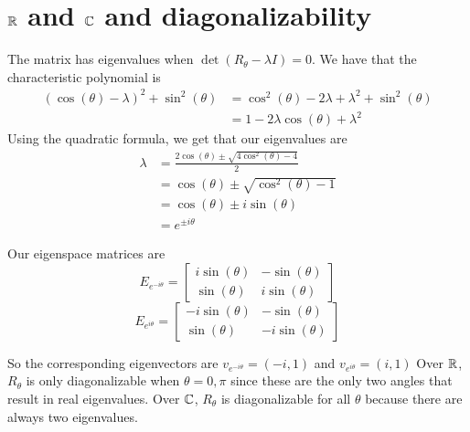 \section{$\mathbb{R}$ and $\mathbb{C}$ and diagonalizability}

The matrix has eigenvalues when
$\det(R_\theta - \lambda I) = 0$.
We have that the characteristic polynomial is
\begin{align}
    (\cos(\theta)-\lambda)^2 + \sin^2(\theta)
    &= \cos^2(\theta) - 2\lambda + \lambda^2 + \sin^2(\theta)\\
    &= 1 - 2\lambda\cos(\theta) + \lambda^2
\end{align}
Using the quadratic formula, we get that our eigenvalues are
\begin{align}
    \lambda
    &= \frac{2\cos(\theta) \pm \sqrt{4\cos^2(\theta) - 4}}{2}\\
    &= \cos(\theta) \pm \sqrt{\cos^2(\theta) - 1}\\
    &= \cos(\theta) \pm i \sin(\theta)\\
    &= e^{\pm i\theta}
\end{align}

Our eigenspace matrices are
\[
E_{e^{-i\theta}} =
\begin{bmatrix}
    i \sin(\theta) & -\sin(\theta)\\
    \sin(\theta) & i \sin(\theta)
\end{bmatrix} 
\]
\[
E_{e^{i\theta}} =
\begin{bmatrix}
    -i \sin(\theta) & -\sin(\theta)\\
    \sin(\theta) & -i \sin(\theta)
\end{bmatrix}
\]

So the corresponding eigenvectors are 
$v_{e^{-i\theta}} = (-i, 1)$ and
$v_{e^{i\theta}} = (i, 1)$
Over $\mathbb{R}$, $R_\theta$ is only diagonalizable when $\theta = 0, \pi$
since these are the only two angles that result in real eigenvalues.
Over $\mathbb{C}$, $R_\theta$ is diagonalizable for all $\theta$
because there are always two eigenvalues.
